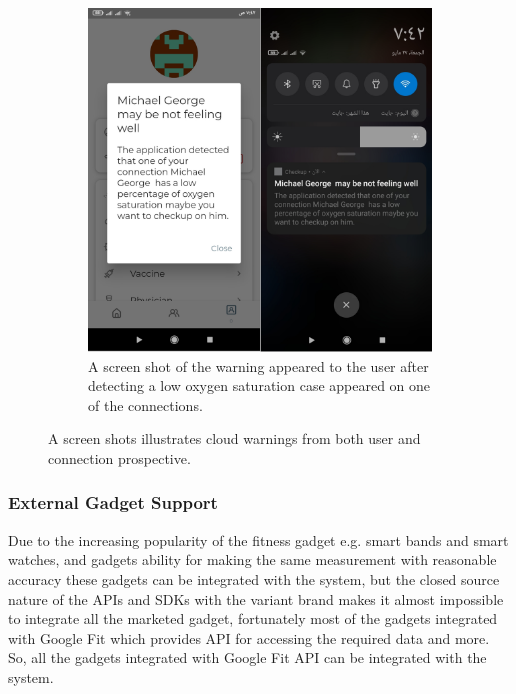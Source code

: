 \documentclass{bmcart}
\begin{document}
\begin{figure}[h!]
\begin{subfigure}{0.45\textwidth}
    \includegraphics[width=\linewidth]{png_images/connection_warnning.png}
  \caption{
  A screen shot of the warning appeared to the user after detecting a low oxygen
  saturation case appeared on one of the connections.}
    \end{subfigure}
    \caption{
    A screen shots illustrates cloud warnings from both user and connection prospective.}
    \end{figure}
\FloatBarrier

\subsubsection*{External Gadget Support}
Due to the increasing popularity of the fitness gadget e.g. smart bands and
smart watches, and gadgets ability for making the same measurement with
reasonable accuracy these gadgets can be integrated with the system, but the
closed source nature of the APIs and SDKs with the variant  brand makes it
almost impossible to integrate all the marketed gadget, fortunately most of the
gadgets integrated with Google Fit which provides API for accessing the required
data and more. So, all the gadgets integrated with Google Fit API can be
integrated with the system.
\end{document}
